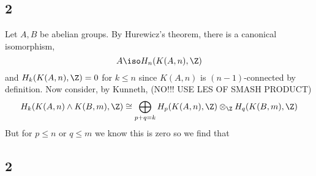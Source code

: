 \documentclass[12pt]{extarticle}
\begin{document}
\subsection*{2}
Let $A,B$ be abelian groups. By Hurewicz's theorem, there is a canonical isomorphism,
\[ A \iso H_n(K(A, n), \Z) \]
and $H_k(K(A,n), \Z) = 0$ for $k \le n$ since $K(A,n)$ is $(n-1)$-connected by definition. Now consider, by Kunneth, (NO!!! USE LES OF SMASH PRODUCT)
\[ H_k(K(A, n) \wedge K(B, m), \Z) \cong \bigoplus_{p + q = k} H_p(K(A,n), \Z) \otimes_\Z H_q(K(B, m), \Z) \]
But for $p \le n$ or $q \le m$ we know this is zero so we find that 

\subsection*{2}
\end{document}
